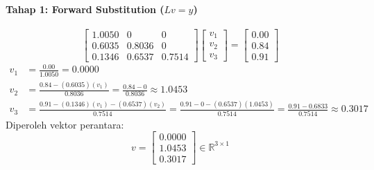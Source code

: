 \documentclass[11pt,a4paper]{article}
\def\mathbf#1{#1}%
\begin{document}
\paragraph{Tahap 1: Forward Substitution ($L \mathbf{v} = \mathbf{y}$)}
\begin{equation}
\begin{bmatrix}
1.0050 & 0 & 0 \\
0.6035 & 0.8036 & 0 \\
0.1346 & 0.6537 & 0.7514
\end{bmatrix}
\begin{bmatrix} v_1 \\ v_2 \\ v_3 \end{bmatrix}
=
\begin{bmatrix} 0.00 \\ 0.84 \\ 0.91 \end{bmatrix}
\end{equation}
\begin{align*}
v_1 &= \frac{0.00}{1.0050} = \mathbf{0.0000} \\
v_2 &= \frac{0.84 - (0.6035)(v_1)}{0.8036} = \frac{0.84 - 0}{0.8036} \approx \mathbf{1.0453} \\
v_3 &= \frac{0.91 - (0.1346)(v_1) - (0.6537)(v_2)}{0.7514} = \frac{0.91 - 0 - (0.6537)(1.0453)}{0.7514} = \frac{0.91 - 0.6833}{0.7514} \approx \mathbf{0.3017}
\end{align*}
Diperoleh vektor perantara:
\begin{equation}
\mathbf{v} = \begin{bmatrix} 0.0000 \\ 1.0453 \\ 0.3017 \end{bmatrix} \in \mathbb{R}^{3 \times 1}
\end{equation}
\end{document}
